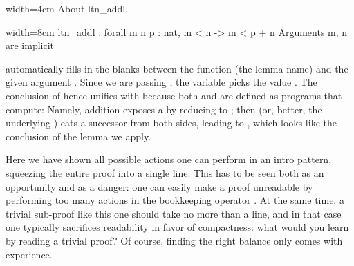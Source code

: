 \begin{coq-left}{}{width=4cm}
About ltn_addl.
$~$
$~$
\end{coq-left}
\begin{coqout-right}{}{width=8cm}
ltn_addl : forall m n p : nat,
  m < n -> m < p + n
Arguments m, n are implicit
\end{coqout-right}

 automatically fills in the blanks between the function
(the lemma name) and the given argument .
Since we are passing , the
variable  picks the value .  The conclusion of 
hence unifies with  because both \C{+} and \C{<} are
defined as programs that compute: Namely, addition exposes a  by
reducing to ; then \C{<} (or, better, the underlying
\C{<=}) eats a successor from both sides, leading to ,
which looks like the conclusion of the lemma we apply.

Here we have shown all possible actions one can perform in an intro
pattern, squeezing the entire proof into a single line.  This has
to be seen both as an opportunity and as a danger: one can easily
make a proof unreadable by performing too many actions in the bookkeeping
operator \C{=>}.  At the same time, a trivial sub-proof like this one
should take no more than a line, and in that case one typically
sacrifices readability in favor of compactness: what would you learn by
reading a trivial proof?  Of course,
finding the right balance only comes with experience.


%

